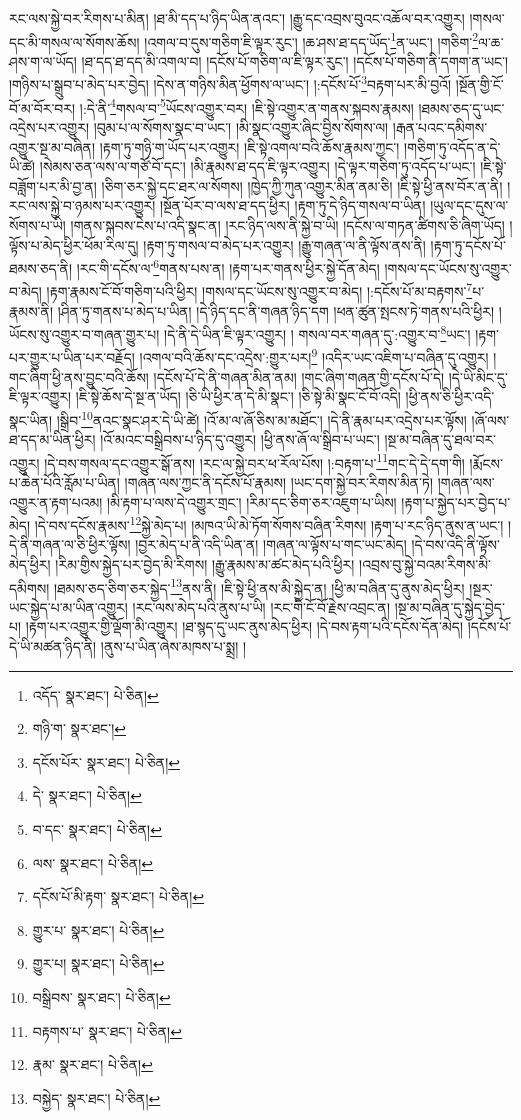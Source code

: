 རང་ལས་སྐྱེ་བར་རིགས་པ་མིན། །ཐ་མི་དད་པ་ཉིད་ཡིན་ནའང་། །རྒྱུ་དང་འབྲས་བུའང་འཆོལ་བར་འགྱུར། །གསལ་དང་མི་གསལ་ལ་སོགས་ཆོས། །འགལ་བ་དུས་གཅིག་ཇི་ལྟར་རུང་། །ཆ་ཤས་ཐ་དད་ཡོད་\footnote{འདོད་  སྣར་ཐང་།  པེ་ཅིན། }ན་ཡང་། །གཅིག་\footnote{གཉི་ག་  སྣར་ཐང་། }ལ་ཆ་ཤས་ག་ལ་ཡོད། །ཐ་དད་ཐ་དད་མི་འགལ་བ། །དངོས་པོ་གཅིག་ལ་ཇི་ལྟར་རུང་། །དངོས་པོ་གཅིག་ནི་དགག་ན་ཡང་། །གཉིས་པ་སྒྲུབ་པ་མེད་པར་བྱེད། །དེས་ན་གཉིས་མིན་ཕྱོགས་ལ་ཡང་། །:དངོས་པོ་\footnote{དངོས་པོར་  སྣར་ཐང་།  པེ་ཅིན། }བརྟག་པར་མི་བྱའོ། །སྔོན་གྱི་ངོ་བོ་མ་བོར་བར། །:དེ་ནི་\footnote{དེ་  སྣར་ཐང་།  པེ་ཅིན། }གསལ་བ་\footnote{བ་དང་  སྣར་ཐང་།  པེ་ཅིན། }ཡོངས་འགྱུར་བར། །ཇི་སྟེ་འགྱུར་ན་གནས་སྐབས་རྣམས། །ཐམས་ཅད་དུ་ཡང་འདྲེས་པར་འགྱུར། །བུམ་པ་ལ་སོགས་སྣང་བ་ཡང་། །མི་སྣང་འགྱུར་ཞིང་བྱིས་སོགས་ལ། །རྒན་པའང་དམིགས་འགྱུར་སྔ་མ་བཞིན། །རྟག་ཏུ་གཉི་ག་ཡོད་པར་འགྱུར། །ཇི་སྟེ་འགལ་བའི་ཆོས་རྣམས་ཀྱང་། །གཅིག་ཏུ་འདོད་ན་དེ་ཡི་ཚེ། །སེམས་ཅན་ལས་ལ་གཙོ་བོ་དང་། །མི་རྣམས་ཐ་དད་ཇི་ལྟར་འགྱུར། །དེ་ལྟར་གཅིག་ཏུ་འདོད་པ་ཡང་། །ཇི་སྟེ་བཟློག་པར་མི་བྱ་ན། །ཅིག་ཅར་སྐྱེ་དང་ཐར་ལ་སོགས། །ཁྱེད་ཀྱི་ཀུན་འགྱུར་མིན་ནམ་ཅི། །ཇི་སྟེ་ཕྱི་ནས་བོར་ན་ནི། །རང་ལས་སྐྱེ་བ་ཉམས་པར་འགྱུར། །སྔོན་པོར་བ་ལས་ཐ་དད་ཕྱིར། །རྟག་ཏུ་དེ་ཉིད་གསལ་བ་ཡིན། །ཡུལ་དང་དུས་ལ་སོགས་པ་ཡི། །གནས་སྐབས་ངེས་པ་འདི་སྣང་ན། །རང་ཉིད་ལས་ནི་སྐྱེ་བ་ཡི། །དངོས་ལ་གཏན་ཚིགས་ཅི་ཞིག་ཡོད། །ལྟོས་པ་མེད་ཕྱིར་ཕོམ་རིལ་དུ། །རྟག་ཏུ་གསལ་བ་མེད་པར་འགྱུར། །རྒྱུ་གཞན་ལ་ནི་ལྟོས་ནས་ནི། །རྟག་ཏུ་དངོས་པོ་ཐམས་ཅད་ནི། །རང་གི་དངོས་ལ་\footnote{ལས་  སྣར་ཐང་།  པེ་ཅིན། }གནས་པས་ན། །རྟག་པར་གནས་ཕྱིར་སྐྱེ་དོན་མེད། །གསལ་དང་ཡོངས་སུ་འགྱུར་བ་མེད། །རྟག་རྣམས་ངོ་བོ་གཅིག་པའི་ཕྱིར། །གསལ་དང་ཡོངས་སུ་འགྱུར་བ་མེད། །:དངོས་པོ་མ་བརྟགས་\footnote{དངོས་པོ་མི་རྟག་  སྣར་ཐང་།  པེ་ཅིན། }པ་རྣམས་ནི། །ཤིན་ཏུ་གནས་པ་མེད་པ་ཡིན། །དེ་ཉིད་དང་ནི་གཞན་ཉིད་དག །ཕན་ཚུན་སྤངས་ཏེ་གནས་པའི་ཕྱིར། །ཡོངས་སུ་འགྱུར་བ་གཞན་གྱུར་པ། །དེ་ནི་དེ་ཡིན་ཇི་ལྟར་འགྱུར། །
གསལ་བར་གཞན་དུ་:འགྱུར་བ་\footnote{གྱུར་པ་  སྣར་ཐང་།  པེ་ཅིན། }ཡང་། །རྟག་པར་གྱུར་པ་ཡིན་པར་བརྗོད། །འགལ་བའི་ཆོས་དང་འདྲེས་:གྱུར་པར།\footnote{གྱུར་པ།  སྣར་ཐང་།  པེ་ཅིན། } །འདིར་ཡང་འཇིག་པ་བཞིན་དུ་འགྱུར། །གང་ཞིག་ཕྱི་ནས་བྱུང་བའི་ཆོས། །དངོས་པོ་དེ་ནི་གཞན་མིན་ནམ། །གང་ཞིག་གཞན་གྱི་དངོས་པོ་དེ། །དེ་ཡི་མིང་དུ་ཇི་ལྟར་འགྱུར། །ཇི་སྟེ་ཆོས་དེ་སྔ་ན་ཡོད། །ཅི་ཡི་ཕྱིར་ན་དེ་མི་སྣང་། །ཅི་སྟེ་མི་སྣང་ངོ་བོ་འདི། །ཕྱི་ནས་ཅི་ཕྱིར་འདི་སྣང་ཡིན། །སྒྲིབ་\footnote{བསྒྲིབས་  སྣར་ཐང་།  པེ་ཅིན། }ནའང་སྣང་ཤར་དེ་ཡི་ཚེ། །འོ་མ་ལ་ཞོ་ཅིས་མ་མཐོང་། །དེ་ནི་རྣམ་པར་འདྲེས་པར་ལྟོས། །ཞོ་ལས་ཐ་དད་མ་ཡིན་ཕྱིར། །འོ་མའང་བསྒྲིབས་པ་ཉིད་དུ་འགྱུར། །ཕྱི་ནས་ཞོ་ལ་སྒྲིབ་པ་ཡང་། །སྔ་མ་བཞིན་དུ་ཐལ་བར་འགྱུར། །དེ་བས་གསལ་དང་འགྱུར་སྒོ་ནས། །རང་ལ་སྐྱེ་བར་ཕ་རོལ་པོས། །:བརྟག་པ་\footnote{བརྟགས་པ་  སྣར་ཐང་།  པེ་ཅིན། }གང་དེ་དེ་དག་གི། །རྨོངས་པ་ཆེན་པོའི་རློམ་པ་ཡིན། །གཞན་ལས་ཀྱང་ནི་དངོས་པོ་རྣམས། །ཡང་དག་སྐྱེ་བར་རིགས་མིན་ཏེ། །གཞན་ལས་འགྱུར་ན་རྟག་པའམ། །མི་རྟག་པ་ལས་དེ་འགྱུར་གྲང་། །རིམ་དང་ཅིག་ཅར་འཇུག་པ་ཡིས། །རྟག་པ་སྐྱེད་པར་བྱེད་པ་མེད། །དེ་བས་དངོས་རྣམས་\footnote{རྣམ་  སྣར་ཐང་།  པེ་ཅིན། }སྐྱེ་མེད་པ། །མཁའ་ཡི་མེ་ཏོག་སོགས་བཞིན་རིགས། །རྟག་པ་རང་ཉིད་ནུས་ན་ཡང་། །དེ་ནི་གཞན་ལ་ཅི་ཕྱིར་ལྟོས། །བྱར་མེད་པ་ནི་འདི་ཡིན་ན། །གཞན་ལ་ལྟོས་པ་གང་ཡང་མེད། །དེ་བས་འདི་ནི་ལྟོས་མེད་ཕྱིར། །རིམ་གྱིས་སྐྱེད་པར་བྱེད་མི་རིགས། །རྒྱུ་རྣམས་མ་ཚང་མེད་པའི་ཕྱིར། །འབྲས་བུ་སྐྱེ་བའམ་རིགས་མི་དམིགས། །ཐམས་ཅད་ཅིག་ཅར་སྐྱེད་\footnote{བསྐྱེད་  སྣར་ཐང་།  པེ་ཅིན། }ནས་ནི། །ཇི་སྟེ་ཕྱི་ནས་མི་སྐྱེད་ན། །ཕྱི་མ་བཞིན་དུ་ནུས་མེད་ཕྱིར། །སྔར་ཡང་སྐྱེད་པ་མ་ཡིན་འགྱུར། །རང་ལས་མེད་པའི་ནུས་པ་ཡི། །རང་གི་ངོ་བོ་རྗེས་འབྲང་ན། །སྔ་མ་བཞིན་དུ་སྐྱེད་བྱེད་པ། །རྟག་པར་འགྱུར་གྱི་ལྡོག་མི་འགྱུར། །ཐ་སྙད་དུ་ཡང་ནུས་མེད་ཕྱིར། །དེ་བས་རྟག་པའི་དངོས་དོན་མེད། །དངོས་པོ་དེ་ཡི་མཚན་ཉིད་ནི། །ནུས་པ་ཡིན་ཞེས་མཁས་པ་སྨྲ། །
